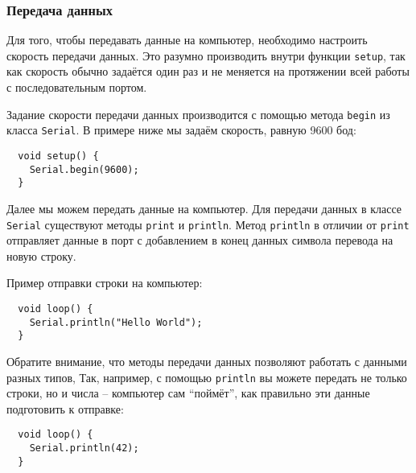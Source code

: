 \documentclass[../sparc.tex]{subfiles}
\begin{document}


\subsubsection{Передача данных}

Для того, чтобы передавать данные на компьютер, необходимо настроить скорость
передачи данных.  Это разумно производить внутри функции \texttt{setup}, так как
скорость обычно задаётся один раз и не меняется на протяжении всей работы с
последовательным портом.

Задание скорости передачи данных производится с помощью метода \texttt{begin} из
класса \texttt{Serial}.  В примере ниже мы задаём скорость, равную 9600 бод:

\begin{verbatim}
  void setup() {
    Serial.begin(9600);
  }
\end{verbatim}

Далее мы можем передать данные на компьютер.  Для передачи данных в классе
\texttt{Serial} существуют методы \texttt{print} и \texttt{println}.  Метод
\texttt{println} в отличии от \texttt{print} отправляет данные в порт с
добавлением в конец данных символа перевода на новую строку.


Пример отправки строки на компьютер:

\begin{verbatim}
  void loop() {
    Serial.println("Hello World");
  }
\end{verbatim}

Обратите внимание, что методы передачи данных позволяют работать с данными
разных типов, Так, например, с помощью \texttt{println} вы можете передать не
только строки, но и числа -- компьютер сам ``поймёт'', как правильно эти данные
подготовить к отправке:

\begin{verbatim}
  void loop() {
    Serial.println(42);
  }
\end{verbatim}
\end{document}

